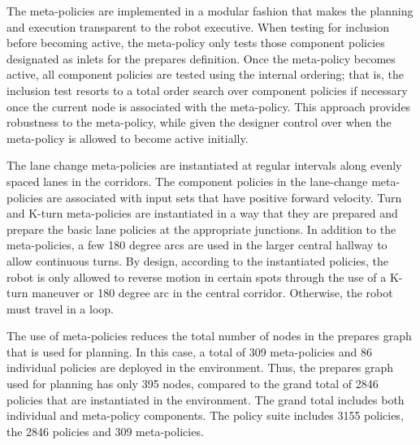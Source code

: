 


The meta-policies are implemented in a modular fashion that makes the planning and
execution transparent to the robot executive.  When testing for inclusion before
becoming active, the meta-policy only tests those component policies designated as
inlets for the prepares definition.  Once the meta-policy becomes active, all
component policies are tested using the internal ordering; that is, the inclusion
test resorts to a total order search over component policies if necessary once the
current node is associated with the meta-policy.  This approach provides robustness
to the meta-policy, while given the designer control over when the meta-policy is
allowed to become active initially.

The lane change meta-policies are instantiated at regular intervals along evenly
spaced lanes in the corridors.  The component policies in the lane-change
meta-policies are associated with input sets that have positive forward velocity.
Turn and K-turn meta-policies are instantiated in a way that they are prepared and
prepare the basic lane policies at the appropriate junctions.  In addition to the
meta-policies, a few 180 degree arcs are used in the larger central hallway to allow
continuous turns.  By design, according to the instantiated policies, the robot is
only allowed to reverse motion in certain spots through the use of a K-turn maneuver
or 180 degree arc in the central corridor.  Otherwise, the robot must travel in a
loop.


The use of meta-policies reduces the total number of nodes in the
prepares graph that is used for planning.  In this case, a total of
309 meta-policies and 86 individual policies are deployed in the
environment.  Thus, the prepares graph used for planning has only 395
nodes, compared to the grand total of 2846 \PF policies that are
instantiated in the environment.  The grand total includes both
individual and meta-policy components.  The policy suite includes 3155
policies, the 2846 \PF policies and 309 meta-policies.

